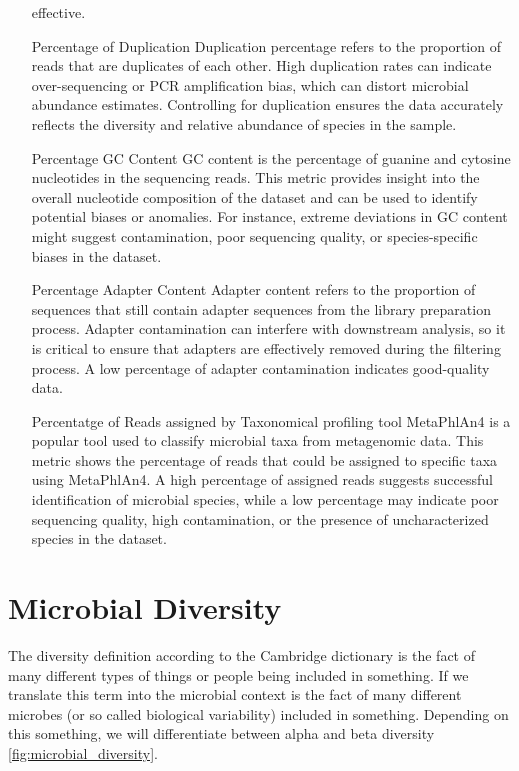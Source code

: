 \begin{itemize}
    effective.
    \item[Percentage of Duplication] Duplication percentage refers to the proportion of reads that are duplicates of 
    each other. High duplication rates can indicate over-sequencing or PCR amplification bias, which can distort microbial 
    abundance estimates. Controlling for duplication ensures the data accurately reflects the diversity and relative 
    abundance of species in the sample.
    \item[Percentage GC Content] GC content is the percentage of guanine and cytosine nucleotides in the sequencing reads. 
    This metric provides insight into the overall nucleotide composition of the dataset and can be used to identify 
    potential biases or anomalies. For instance, extreme deviations in GC content might suggest contamination, poor 
    sequencing quality, or species-specific biases in the dataset.
    \item[Percentage Adapter Content] Adapter content refers to the proportion of sequences that still contain adapter 
    sequences from the library preparation process. Adapter contamination can interfere with downstream analysis, so it 
    is critical to ensure that adapters are effectively removed during the filtering process. A low percentage of adapter 
    contamination indicates good-quality data.
    \item[Percentatge of Reads assigned by Taxonomical profiling tool] MetaPhlAn4 is a popular tool used to classify 
    microbial taxa from metagenomic data. This metric shows the percentage of reads that could be assigned to specific 
    taxa using MetaPhlAn4. A high percentage of assigned reads suggests successful identification of microbial species, 
    while a low percentage may indicate poor sequencing quality, high contamination, or the presence of uncharacterized 
    species in the dataset.
\end{itemize}

\section{Microbial Diversity}
The diversity definition according to the Cambridge dictionary is the fact of many different types of things or people being included 
in something. If we translate this term into the microbial context is the fact of many different microbes (or so called 
biological variability) included in something. Depending on this something, we will differentiate between alpha and beta
diversity \autoref{fig:microbial_diversity}.

